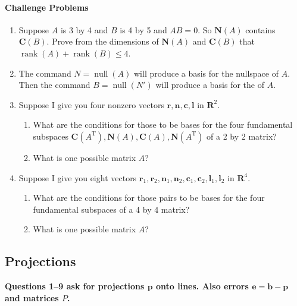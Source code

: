 \documentclass[14pt, a4paper]{article}
\begin{document}
\paragraph{Challenge Problems}
\begin{enumerate}[resume]
    \item Suppose $A$ is 3 by 4 and $B$ is 4 by 5 and $AB = 0$. So $\mathbf{N}(A)$ contains $\mathbf{C}(B)$. Prove from the dimensions of $\mathbf{N}(A)$ and $\mathbf{C}(B)$ that $\operatorname{rank}(A) + \operatorname{rank}(B) \le 4$.

    \item The command $N = \operatorname{null}(A)$ will produce a basis for the nullspace of $A$. Then the command $B = \operatorname{null}(N')$ will produce a basis for the \underline{\hspace{2cm}} of $A$.

    \item Suppose I give you four nonzero vectors $\boldsymbol{r}, \boldsymbol{n}, \boldsymbol{c}, \boldsymbol{l}$ in $\mathbf{R}^2$.
          \begin{enumerate}
              \item What are the conditions for those to be bases for the four fundamental subspaces $\mathbf{C}(A^{\mathrm{T}}), \mathbf{N}(A), \mathbf{C}(A), \mathbf{N}(A^{\mathrm{T}})$ of a 2 by 2 matrix?
              \item What is one possible matrix $A$?
          \end{enumerate}

    \item Suppose I give you eight vectors $\boldsymbol{r}_1, \boldsymbol{r}_2, \boldsymbol{n}_1, \boldsymbol{n}_2, \boldsymbol{c}_1, \boldsymbol{c}_2, \boldsymbol{l}_1, \boldsymbol{l}_2$ in $\mathbf{R}^4$.
          \begin{enumerate}
              \item What are the conditions for those pairs to be bases for the four fundamental subspaces of a 4 by 4 matrix?
              \item What is one possible matrix $A$?
          \end{enumerate}
\end{enumerate}

\subsection{Projections}
\noindent \textbf{Questions 1--9 ask for projections $\boldsymbol{p}$ onto lines. Also errors $\boldsymbol{e} = \boldsymbol{b} - \boldsymbol{p}$ and matrices $P$.}
\end{document}
